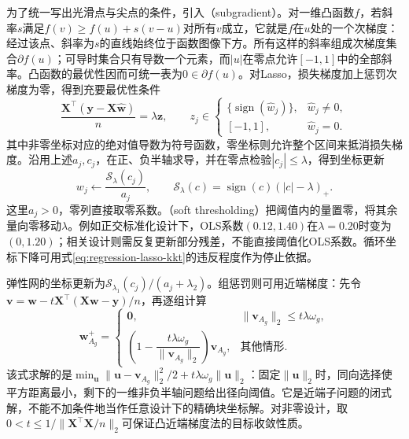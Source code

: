 为了统一写出光滑点与尖点的条件，引入（subgradient）。对一维凸函数$f$，若斜率$s$满足$f(v)\geq f(u)+s(v-u)$对所有$v$成立，它就是$f$在$u$处的一个次梯度：经过该点、斜率为$s$的直线始终位于函数图像下方。所有这样的斜率组成次梯度集合$\partial f(u)$；可导时集合只有导数一个元素，而$|u|$在零点允许$[-1,1]$中的全部斜率。凸函数的最优性因而可统一表为$0\in\partial f(u)$。对Lasso，损失梯度加上惩罚次梯度为零，得到充要最优性条件
\begin{equation}
  \frac{\bm{X}^{\top}(\bm{y}-\bm{X}\widehat{\bm{w}})}{n}
  =\lambda\bm{z},\qquad
  z_j\in
  \begin{cases}
    \{\operatorname{sign}(\widehat w_j)\},&\widehat w_j\ne0,\\
    [-1,1],&\widehat w_j=0.
  \end{cases}
  \label{eq:regression-lasso-kkt}
\end{equation}
其中非零坐标对应的绝对值导数为符号函数，零坐标则允许整个区间来抵消损失梯度。沿用上述$a_j,c_j$，在正、负半轴求导，并在零点检验$|c_j|\leq\lambda$，得到坐标更新
\begin{equation}
  w_j\leftarrow\frac{\mathcal{S}_{\lambda}(c_j)}{a_j},
  \qquad
  \mathcal{S}_{\lambda}(c)=\operatorname{sign}(c)(|c|-\lambda)_+.
  \label{eq:regression-soft-threshold}
\end{equation}
这里$a_j>0$，零列直接取零系数。（soft thresholding）把阈值内的量置零，将其余量向零移动$\lambda$。例如正交标准化设计下，OLS系数$(0.12,1.40)$在$\lambda=0.20$时变为$(0,1.20)$；相关设计则需反复更新部分残差，不能直接阈值化OLS系数。循环坐标下降可用式\eqref{eq:regression-lasso-kkt}的违反程度作为停止依据。

弹性网的坐标更新为$\mathcal{S}_{\lambda_1}(c_j)/(a_j+\lambda_2)$。组惩罚则可用近端梯度：先令$\bm{v}=\bm{w}-t\bm{X}^{\top}(\bm{X}\bm{w}-\bm{y})/n$，再逐组计算
\begin{equation}
  \bm{w}_{A_g}^{+}
  =
  \begin{cases}
    \bm{0},&\lVert\bm{v}_{A_g}\rVert_2\leq t\lambda\omega_g,\\
    \left(1-\dfrac{t\lambda\omega_g}{\lVert\bm{v}_{A_g}\rVert_2}\right)
      \bm{v}_{A_g},&\text{其他情形}.
  \end{cases}
  \label{eq:regression-group-prox}
\end{equation}
该式求解的是$\min_{\bm{u}}\lVert\bm{u}-\bm{v}_{A_g}\rVert_2^2/2+t\lambda\omega_g\lVert\bm{u}\rVert_2$：固定$\lVert\bm{u}\rVert_2$时，同向选择使平方距离最小，剩下的一维非负半轴问题给出径向阈值。它是近端子问题的闭式解，不能不加条件地当作任意设计下的精确块坐标解。对非零设计，取$0<t\leq1/\lVert\bm{X}^{\top}\bm{X}/n\rVert_2$可保证凸近端梯度法的目标收敛性质。


